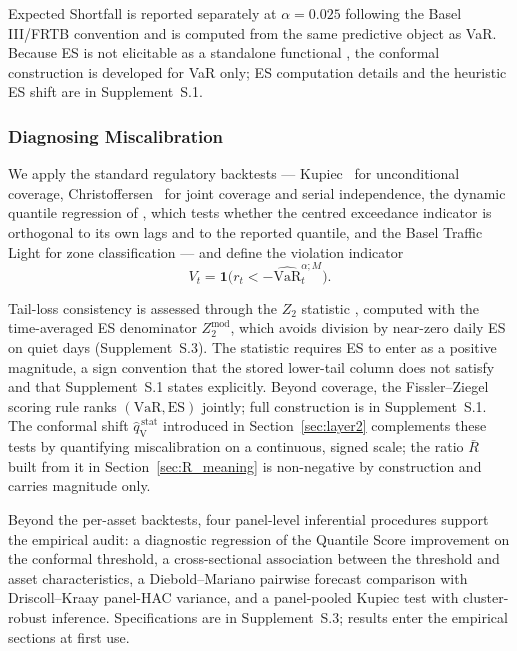 \documentclass[preprint,11pt,authoryear]{elsarticle}
\newcommand{\VaR}{\mathrm{VaR}}
\newcommand{\ES}{\mathrm{ES}}
\newcommand{\1}{\boldsymbol{1}}
\newcommand{\qVstat}{\hat{q}_{\scriptscriptstyle\mathrm{V}}^{\,\mathrm{stat}}}
\begin{document}
Expected Shortfall is reported separately at $\alpha = 0.025$ following the Basel III/FRTB convention \citep{bcbs2019frtb} and is computed from the same predictive object as VaR. Because ES is not elicitable as a standalone functional \citep{gneiting2011making}, the conformal construction is developed for VaR only; ES computation details and the heuristic ES shift are in Supplement~S.1.

\subsubsection{Diagnosing Miscalibration}
\label{sec:diag}

We apply the standard regulatory backtests --- Kupiec~\citep{kupiec1995} for unconditional coverage, Christoffersen~\citep{christoffersen1998} for joint coverage and serial independence, the dynamic quantile regression of \citet{engle2004caviar}, which tests whether the centred exceedance indicator is orthogonal to its own lags and to the reported quantile, and the Basel Traffic Light \citep{basel1996} for zone classification --- and define the violation indicator
\begin{equation}
	V_t = \mathbf{1}\bigl(r_t < -\widehat{\VaR}_t^{\alpha;M}\bigr).
\end{equation}

Tail-loss consistency is assessed through the $Z_2$ statistic \citep{acerbi2014back}, computed with the time-averaged ES denominator $Z_2^{\mathrm{mod}}$, which avoids division by near-zero daily ES on quiet days (Supplement~S.3). The statistic requires ES to enter as a positive magnitude, a sign convention that the stored lower-tail column does not satisfy and that Supplement~S.1 states explicitly. Beyond coverage, the Fissler--Ziegel scoring rule \citep{fissler2016higher} ranks $(\VaR, \ES)$ jointly; full construction is in Supplement~S.1. The conformal shift $\qVstat$ introduced in Section~\ref{sec:layer2} complements these tests by quantifying miscalibration on a continuous, signed scale; the ratio $\bar R$ built from it in Section~\ref{sec:R_meaning} is non-negative by construction and carries magnitude only.

Beyond the per-asset backtests, four panel-level inferential procedures support the empirical audit: a diagnostic regression of the Quantile Score improvement on the conformal threshold, a cross-sectional association between the threshold and asset characteristics, a Diebold--Mariano pairwise forecast comparison \citep{diebold1995comparing} with Driscoll--Kraay panel-HAC \citep{driscoll1998consistent} variance, and a panel-pooled Kupiec test with cluster-robust inference. Specifications are in Supplement~S.3; results enter the empirical sections at first use.
\end{document}
